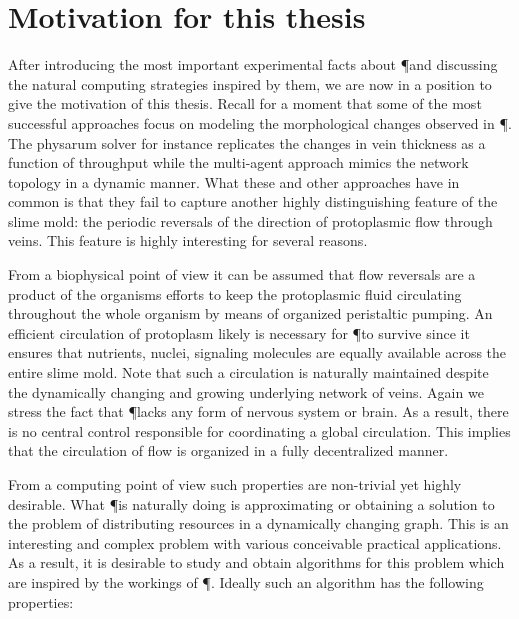 \section{Motivation for this thesis}

	After introducing the most important experimental facts about \P and discussing the natural computing strategies inspired by them, we are now in a position to give the motivation of this thesis. Recall for a moment that some of the most successful approaches focus on modeling the morphological changes observed in \P. The physarum solver for instance replicates the changes in vein thickness as a function of throughput while the multi-agent approach mimics the network topology in a dynamic manner. What these and other approaches have in common is that they fail to capture another highly distinguishing feature of the slime mold: the periodic reversals of the direction of protoplasmic flow through veins. This feature is highly interesting for several reasons. 

	From a biophysical point of view it can be assumed that flow reversals are a product of the organisms efforts to keep the protoplasmic fluid circulating throughout the whole organism by means of organized peristaltic pumping. An efficient circulation of protoplasm likely is necessary for \P to survive since it ensures that nutrients, nuclei, signaling molecules \etc are equally available across the entire slime mold. Note that such a circulation is naturally maintained despite the dynamically changing and growing underlying network of veins. Again we stress the fact that \P lacks any form of nervous system or brain. As a result, there is no central control responsible for coordinating a global circulation. This implies that the circulation of flow is organized in a fully decentralized manner.

	From a computing point of view such properties are non-trivial yet highly desirable. What \P is naturally doing is approximating or obtaining a solution to the problem of distributing resources in a dynamically changing graph. This is an interesting and complex problem with various conceivable practical applications. As a result, it is desirable to study and obtain algorithms for this problem which are inspired by the workings of \P. Ideally such an algorithm has the following properties:

